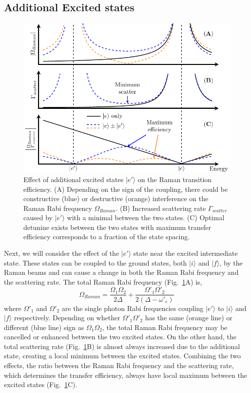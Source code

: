 \subsection{Additional Excited states}
\label{ch:raman-transfer:extra-ext}

\begin{figure}
  \centering
  \includegraphics[width=\textwidth]{figures/raman_transfer_extra_ext_states.pdf}
  \caption[Raman transition with additional excited states]{
    Effect of additional excited states $|e'\rangle$ on the Raman transition efficiency.
    (A) Depending on the sign of the coupling, there could be constructive (blue)
    or destructive (orange) interference on the Raman Rabi frequency $\Omega_{Raman}$.
    (B) Increased scattering rate $\Gamma_{scatter}$ caused by $|e'\rangle$ with a minimal
    between the two states.
    (C) Optimal detunine exists between the two states with maximum transfer efficiency
    corresponds to a fraction of the state spacing.
    \label{fig:raman-transfer-extra-ext-states}}
\end{figure}

Next, we will consider the effect of the $|e'\rangle$ state near the excited intermediate state.
These states can be coupled to the ground states, both $|i\rangle$ and $|f\rangle$,
by the Raman beams and can cause a change in both the Raman Rabi frequency
and the scattering rate.
The total Raman Rabi frequency (Fig.~\ref{fig:raman-transfer-extra-ext-states}A) is,
\[
  \Omega_{Raman}=\frac{\Omega_1\Omega_2}{2\Delta}+\frac{\Omega'_1\Omega'_2}{2(\Delta-\omega'_e)}
\]
where $\Omega'_1$ and $\Omega'_2$ are the single photon Rabi frequencies coupling $|e'\rangle$
to $|i\rangle$ and $|f\rangle$ respectively.
Depending on whether $\Omega'_1\Omega'_2$ has the same (orange line)
or different (blue line) sign as $\Omega_1\Omega_2$, the total Raman Rabi frequency
may be cancelled or enhanced between the two excited states.
On the other hand, the total scattering rate (Fig.~\ref{fig:raman-transfer-extra-ext-states}B)
is almost always increased due to the additional state, creating a local minimum
between the excited states.
Combining the two effects, the ratio between the Raman Rabi frequency and
the scattering rate, which determines the transfer efficiency, always have local maximum
between the excited states (Fig.~\ref{fig:raman-transfer-extra-ext-states}C).

